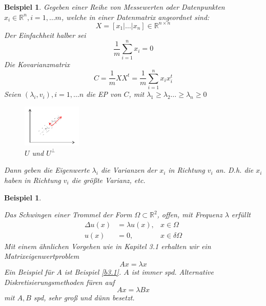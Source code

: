 \documentclass{book}
\newtheorem{example}[algorithm]{Beispiel}
\def\R{\mathbb{R}}
\begin{document}
            \begin{example}\label{b4.5}
                Gegeben einer Reihe von Messewerten  oder Datenpunkten $x_i\in\R^n,i=1,\dots m$, welche in einer Datenmatrix angeordnet sind:
                \begin{equation*}
                    X=[x_1\vert\dots\vert x_n]\in\R^{n\times n}
                \end{equation*}
                Der Einfachheit halber sei \[\frac{1}{m}\sum_{i=1}^nx_i=0\]
                Die Kovarianzmatrix 
                \[C=\frac{1}{m}XX^t=\frac{1}{m}\sum_{i=1}^n x_ix_i^t\]
                Seien $(\lambda_i,v_i),i=1,\dots n$ die EP von $C$, mit $\lambda_1\geq \lambda_2\dots\geq \lambda_n\geq 0$ 
                \begin{figure}[H]
                    \centering
                    \includegraphics[width=0.25\textwidth]{Bild012}
                    \caption{\(U\) und \(U^\perp\)}
                \end{figure}
                Dann geben die Eigenwerte $\lambda_i$ die Varianzen der $x_i$ in Richtung $v_i$ an. D.h. die $x_i$ haben in Richtung 
                $v_i$ die größte Varianz, etc.
            \end{example}

            \begin{example}\label{b4.6}
                
                Das Schwingen einer Trommel der Form $\Omega\subset \R^2$, offen, mit Frequenz $\lambda$ erfüllt
                \begin{align*}
                    \Delta u(x)&=\lambda u(x), & x\in\Omega \\ 
                    u(x)&=0, & x\in\delta\Omega 
                \end{align*}
                Mit einem ähnlichen Vorgehen wie in Kapitel 3.1 erhalten wir ein Matrixeigenwertproblem 
                \[
                    Ax=\lambda x    
                \]
                Ein Beispiel für $A$ ist Beispiel \ref*{b3.1}. $A$ ist immer spd. Alternative Diskretisierungsmethoden 
                füren auf 
                \[
                    Ax=\lambda Bx    
                \]
                mit $A,B$ spd, sehr groß und dünn besetzt.

            \end{example}
\end{document}
